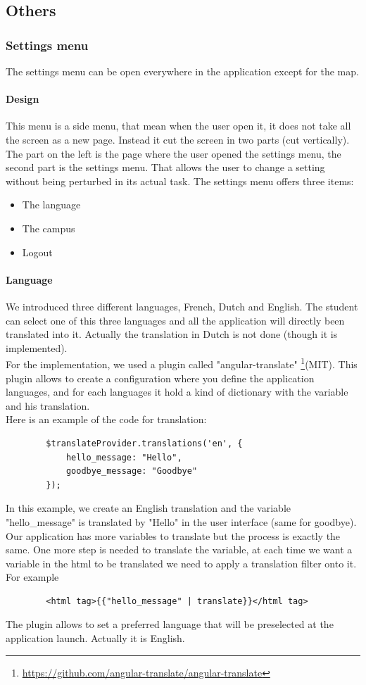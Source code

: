 \documentclass{eplmastersthesis}
\begin{document}
\subsection{Others}
\subsubsection{Settings menu}
The settings menu can be open everywhere in the application except for the map.
\paragraph{Design}
This menu is a side menu, that mean when the user open it, it does not take all the screen as a new page. Instead it cut the screen in two parts (cut vertically). The part on the left is the page where the user opened the settings menu, the second part is the settings menu. That allows the user to change a setting without being perturbed in its actual task.
The settings menu offers three items:
\begin{itemize}
\item The language
\item The campus
\item Logout
\end{itemize}
\paragraph{Language} We introduced three different languages, French, Dutch and English. The student can select one of this three languages and all the application will directly been translated into it. Actually the translation in Dutch is not done (though it is implemented). \\
For the implementation, we used a plugin called "angular-translate" \footnote{\url{https://github.com/angular-translate/angular-translate}}(MIT). This plugin allows to create a configuration where you define the application languages, and for each languages it hold a kind of dictionary with the variable and his translation.\\
Here is an example of the code for translation:
\begin{verbatim}
        $translateProvider.translations('en', {
            hello_message: "Hello",
            goodbye_message: "Goodbye"
        });
\end{verbatim}
In this example, we create an English translation and the variable "hello\_message" is translated by "Hello" in the user interface (same for goodbye). Our application has more variables to translate but the process is exactly the same. One more step is needed to translate the variable, at each time we want a variable in the html to be translated we need to apply a translation filter onto it. For example 
\begin{verbatim}
		<html tag>{{"hello_message" | translate}}</html tag> 
\end{verbatim}
The plugin allows to set a preferred language that will be preselected at the application launch. Actually it is English.
\end{document}
